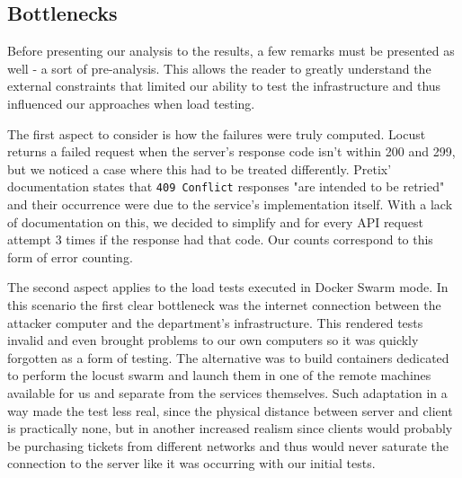 \documentclass[12pt]{article}
\begin{document}





\subsection{Bottlenecks} \label{performance.bottlenecks} %


Before presenting our analysis to the results, a few remarks must be presented as well - a sort of pre-analysis.
This allows the reader to greatly understand the external constraints that limited our ability to test the infrastructure and thus influenced our approaches 
when load testing.

The first aspect to consider is how the failures were truly computed.
Locust returns a failed request when the server's response code isn't within 200 and 299, but we noticed a case where this had to be treated differently.
Pretix' documentation states that \texttt{409 Conflict} responses "are intended to be retried" and their occurrence were due to the service's implementation itself.
With a lack of documentation on this, we decided to simplify and for every API request attempt 3 times if the response had that code.
Our counts correspond to this form of error counting.

The second aspect applies to the load tests executed in Docker Swarm mode.
In this scenario the first clear bottleneck was the internet connection between the attacker computer and the department's infrastructure.
This rendered tests invalid and even brought problems to our own computers so it was quickly forgotten as a form of testing.
The alternative was to build containers dedicated to perform the locust swarm and launch them in one of the remote machines available for us and separate from 
the services themselves.
Such adaptation in a way made the test less real, since the physical distance between server and client is practically none, but in another increased realism 
since clients would probably be purchasing tickets from different networks and thus would never saturate the connection to the server like it was occurring with 
our initial tests.
\end{document}
